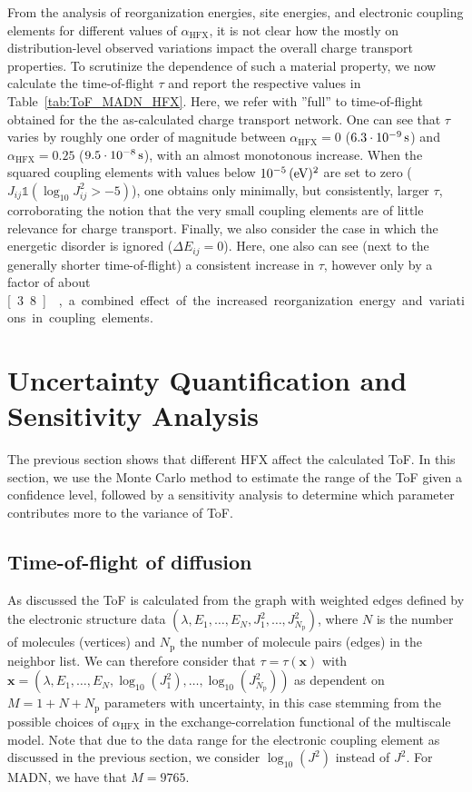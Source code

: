 \documentclass[%
 reprint,
superscriptaddress,
 amsmath,amssymb,
 aps,
prb,
floatfix
]{revtex4-2}
\newcommand{\bjoern}[2]{{\color{blue}{{\bf #1} #2}}}
\newcommand{\ahfx}{\ensuremath{\alpha_\text{HFX}}\xspace}
\begin{document}
From the analysis of reorganization energies, site energies, and electronic coupling elements for different values of \ahfx, it is not clear how the mostly on distribution-level observed variations impact the overall charge transport properties. To scrutinize the dependence of such a material property, we now calculate the time-of-flight $\tau$ and report the respective values in Table~\ref{tab:ToF_MADN_HFX}. Here, we refer with ''full'' to time-of-flight obtained for the the as-calculated charge transport network. One can see that $\tau$ varies by roughly one order of magnitude between $\ahfx=0$ ($\unit[6.3\cdot 10^{-9}]{s}$) and $\ahfx=0.25$ ($\unit[9.5\cdot 10^{-8}]{s}$), with an almost monotonous increase. When the squared coupling elements with values below $\unit[10^{-5}]{(eV)^2}$ are set to zero ($J_{ij} \mathbb{1}(\log_{10} J^2_{ij} > -5)$), one obtains only minimally, but consistently, larger $\tau$, corroborating the notion that the very small coupling elements are of little relevance for charge transport. Finally, we also consider the case in which the energetic disorder is ignored ($\Delta E_{ij}=0$). Here, one also can see (next to the generally shorter time-of-flight) a consistent increase in $\tau$, however only by a factor of about \unit[3.8]{}, a combined effect of the increased reorganization energy and variations in coupling elements.




\section{Uncertainty Quantification and Sensitivity Analysis}
\label{sec:UQ}
The previous section shows that different HFX affect the calculated ToF. In this section, we use the Monte Carlo method to estimate the range of the ToF given a confidence level, followed by a sensitivity analysis to determine which parameter contributes more to the variance of ToF. 

\subsection{Time-of-flight of diffusion}
As discussed the ToF is calculated from the graph with weighted edges defined by the electronic structure data $(\lambda, E_1,\ldots,E_N, J_1^2,\ldots,J_{N_\text{p}}^2)$, where $N$ is the number of molecules (vertices) and $N_\text{p}$ the number of molecule pairs (edges) in the neighbor list. We can therefore consider that $\tau = \tau(\mathbf{x})$ with $\mathbf{x}=(\lambda, E_1,\ldots,E_N, \log_{10}(J_1^2),\ldots,\log_{10}(J_{N_\text{p}}^2))$ as dependent on $M = 1+N+N_\text{p}$ parameters with uncertainty, in this case stemming from the possible choices of \ahfx in the exchange-correlation functional of the multiscale model. Note that due to the data range for the electronic coupling element as discussed in the previous section, we consider $\log_{10}(J^2)$ instead of $J^2$. For MADN, we have that $M=9765$. \bjoern{ADD:}{how many pairs? $N_\text{p}=8764$}
\end{document}
